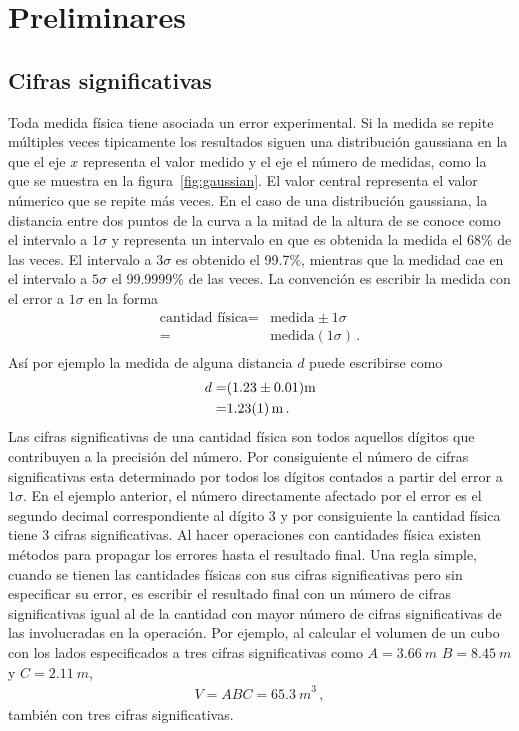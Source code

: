 \chapter{Preliminares}

\section{Cifras significativas}

Toda medida física tiene asociada un error experimental. Si la medida se repite múltiples veces tipicamente los resultados siguen una distribución gaussiana en la que el eje $x$ representa el valor medido y el eje el número de medidas,  como la que se muestra en la figura~\ref{fig:gaussian}. El valor central representa el valor númerico que se repite más veces. En el caso de una distribución gaussiana, la distancia entre dos puntos de la curva a la mitad de la altura de se conoce como el intervalo a $1\sigma$ y representa un intervalo en que es obtenida la medida el 68\% de las veces. El intervalo a $3\sigma$ es obtenido el 99.7\%, mientras que la medidad cae en el intervalo a $5\sigma$ el 99.9999\% de las veces. La convención es escribir la medida con el error a $1\sigma$ en la forma
\begin{align*}
  \text{cantidad física}=&\text{medida}\pm 1\sigma\\
=&\text{medida}(1\sigma)\,.\\
\end{align*}
Así por ejemplo la medida de alguna distancia $d$ puede escribirse como
\begin{align*}
d=&(1.23\pm 0.01)\si{m}\nonumber\\
  =&\SI{1.23\pm 0.01}{m}\,.
\end{align*}
Las cifras significativas de una cantidad física son todos aquellos dígitos que contribuyen a la precisión del número. Por consiguiente el número de cifras significativas esta determinado por todos los dígitos contados a partir del error a $1\sigma$. En el ejemplo anterior, el número directamente afectado por el error es el segundo decimal correspondiente al dígito 3 y por consiguiente la cantidad física tiene 3 cifras significativas. Al hacer operaciones con cantidades física existen métodos para propagar los errores hasta el resultado final. Una regla simple, cuando se tienen las cantidades físicas con sus cifras significativas pero sin especificar su error, es escribir el resultado final con un número de cifras significativas igual al de la cantidad con mayor número de cifras significativas de las involucradas en la operación. Por ejemplo, al calcular el volumen de un cubo con los lados especificados a tres cifras significativas como  $A =\SI{3.66}{m}$ $B = \SI{8.45}{m}$ y  $C=\SI{2.11}{m}$,
\begin{align*}
  V=ABC=\SI{65.3}{m}^3\,,
\end{align*}
también con tres cifras significativas.




